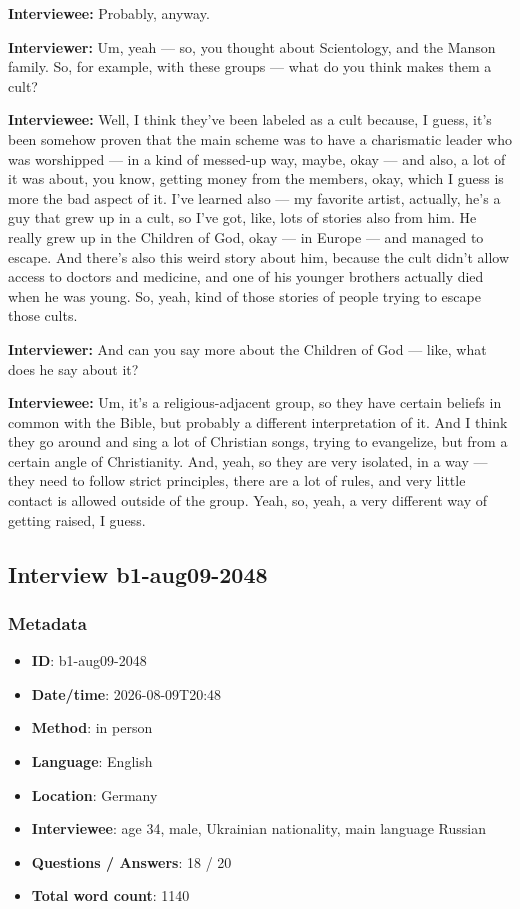 \textbf{Interviewee:} Probably, anyway.

\textbf{Interviewer:}  Um, yeah — so, you thought about Scientology, and the Manson family. So, for example, with these groups — what do you think makes them a cult?

\textbf{Interviewee:} Well, I think they've been labeled as a cult because, I guess, it's been somehow proven that the main scheme was to have a charismatic leader who was worshipped — in a kind of messed-up way, maybe, okay — and also, a lot of it was about, you know, getting money from the members, okay, which I guess is more the bad aspect of it. I've learned also —  my favorite artist, actually, he's a guy that grew up in a cult, so I've got, like, lots of stories also from him. He really grew up in the Children of God, okay — in Europe — and managed to escape. And there's also this weird story about him, because the cult didn't allow access to doctors and medicine, and one of his younger brothers actually died when he was young. So, yeah, kind of those stories of people trying to escape those cults.

\textbf{Interviewer:} And can you say more about the Children of God — like, what does he say about it?

\textbf{Interviewee:} Um, it's a religious-adjacent group, so they have certain beliefs in common with the Bible, but probably a different interpretation of it. And I think they go around and sing a lot of Christian songs, trying to evangelize, but from a certain angle of Christianity. And, yeah, so they are very isolated, in a way — they need to follow strict principles, there are a lot of rules, and very little contact is allowed outside of the group. Yeah, so, yeah, a very different way of getting raised, I guess.

\subsection{Interview b1-aug09-2048}\label{int:b1-aug09-2048}
\subsubsection*{Metadata}
\begin{itemize}
  \item \textbf{ID}: b1-aug09-2048
  \item \textbf{Date/time}: 2026-08-09T20:48
  \item \textbf{Method}: in person
  \item \textbf{Language}: English
  \item \textbf{Location}: Germany
  \item \textbf{Interviewee}: age 34, male, Ukrainian nationality, main language Russian
  \item \textbf{Questions / Answers}: 18 / 20
  \item \textbf{Total word count}: 1140
\end{itemize}
